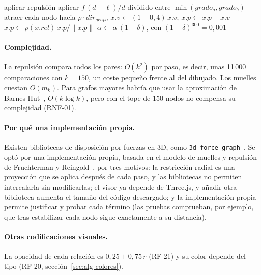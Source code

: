 \begin{algorithm}[htbp]
  \caption{Un paso de la simulación (\texttt{SimulacionFuerzas.paso}).}
  \label{alg:fuerzas}
  \begin{algorithmic}[1]
       \State aplicar repulsión \EndFor {}
       \State aplicar $f\,(d-\ell)/d$ dividido entre $\min(grado_a, grado_b)$ \EndFor
       \State atraer cada nodo hacia $\rho\cdot dir_{grupo}$ \EndIf
        \State $x.v \gets (1-0{,}4)\,x.v$; \quad $x.p \gets x.p + x.v$
        \State $x.p \gets \rho(x.rel)\, x.p / \lVert x.p \rVert$ 
      \EndFor
      \State $\alpha \gets \alpha\,(1-\delta)$, con $(1-\delta)^{300} = 0{,}001$
    \EndProcedure
  \end{algorithmic}
\end{algorithm}

\paragraph{Complejidad.} La repulsión compara todos los pares: $O(k^2)$ por paso, es decir, unas 11\,000 comparaciones con $k=150$, un coste pequeño frente al del dibujado. Los muelles cuestan $O(m_k)$. Para grafos mayores habría que usar la aproximación de Barnes-Hut~\cite{barneshut1986}, $O(k\log k)$, pero con el tope de 150 nodos no compensa su complejidad (RNF-01). 

\paragraph{Por qué una implementación propia.} Existen bibliotecas de disposición por fuerzas en 3D, como \texttt{3d-force-graph}~\cite{asturiano3dforcegraph}. Se optó por una implementación propia, basada en el modelo de muelles y repulsión de Fruchterman y Reingold~\cite{fruchterman1991}, por tres motivos: la restricción radial es una proyección que se aplica después de cada paso, y las bibliotecas no permiten intercalarla sin modificarlas; el visor ya depende de Three.js, y añadir otra biblioteca aumenta el tamaño del código descargado; y la implementación propia permite justificar y probar cada término (las pruebas comprueban, por ejemplo, que tras estabilizar cada nodo sigue exactamente a su distancia).

\paragraph{Otras codificaciones visuales.} La opacidad de cada relación es $0{,}25 + 0{,}75\,r$ (RF-21) y su color depende del tipo (RF-20, sección~\ref{sec:alg-colores}).

